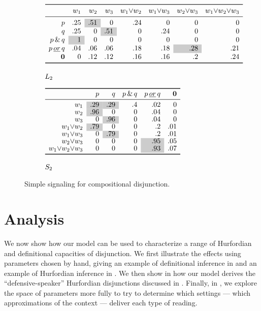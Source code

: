 \documentclass[12pt,twoside]{article}
\renewcommand{\_}{\textbf{\textunderscore\hspace{-4pt}\textunderscore\hspace{-3pt}\textunderscore\hspace{-4pt}\textunderscore}\hspace{0.5pt}}			%
\begin{document}
\begin{figure}[tp]
  \centering
  \begin{subfigure}{1\textwidth}
    \centering
    $\closurelex
    {.25 & \graycell{.51} & 0 & .24 & 0 & 0 & 0}
    {\graycell{1} & 0 & 0 & 0 & 0 & 0 & 0}
    {.25 & 0 & \graycell{.51} & 0 & .24 & 0 & 0}
    {.04 & .06 & .06 & .18 & .18 & \graycell{.28} & .21}
    {0 & .12 & .12 & .16 & .16 & .2 & .24}$
    \caption{$\ListenerK[2]$}
  \end{subfigure}

  \begin{subfigure}{1\textwidth}
    \centering
    $\begin{array}[c]{ *{6}{r} }
       \toprule
       & p & q & \pandq & \porq & \nullmsg \\
       \midrule
       w_{1} & \graycell{.29} & \graycell{.29} & .4 & .02 & 0 \\
       w_{2} & \graycell{.96} & 0   & 0  & .04 & 0 \\
       w_{3} & 0   & \graycell{.96} & 0  & .04 & 0 \\
       w_{1}{\vee}w_{2} & \graycell{.79} & 0   & 0  & .2  & .01 \\
       w_{1}{\vee}w_{3} & 0   & \graycell{.79} & 0 & .2  & .01 \\
       w_{2}{\vee}w_{3} & 0   & 0   & 0 & \graycell{.95} & .05 \\
       w_{1}{\vee}w_{2}{\vee}w_{3} & 0   & 0   & 0 & \graycell{.93} & .07 \\
       \bottomrule
     \end{array}$
     \caption{$\SpeakerK[2]$}
   \end{subfigure}
   \caption{Simple signaling for compositional disjunction.}
  \label{fig:compdisj}
\end{figure}




\vspace{-8pt}

\section{Analysis}\label{sec:analysis}

We now show how our model can be used to characterize a range of
Hurfordian and definitional capacities of disjunction. We first
illustrate the effects using parameters chosen by hand, giving an
example of definitional inference in
 and an example of Hurfordian
inference in .  We then show in
 how our model derives the
``defensive-speaker'' Hurfordian disjunctions discussed in
.  Finally, in
, we explore the space of parameters more
fully to try to determine which settings --- which approximations of
the context --- deliver each type of reading.
\end{document}
